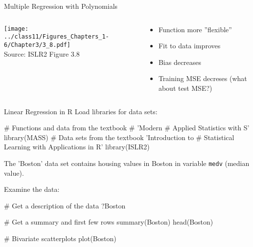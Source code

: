 \documentclass[ignorenonframetext,xcolor=x11names]{beamer}
\begin{document}



\begin{frame}{Multiple Regression with Polynomials}
\begin{columns}
\begin{column}{.7\textwidth}
\begin{center}
\texttt{[image: ../class11/Figures\_Chapters\_1-6/Chapter3/3\_8.pdf]} \\

\scriptsize Source: ISLR2 Figure 3.8
\end{center}
\end{column}
\begin{column}{.3\textwidth}
\begin{itemize}
  \item Function more ''flexible''
  \item Fit to data improves
  \item Bias decreases
  \item Training MSE decreses (what about test MSE?)
\end{itemize}
\end{column}
\end{columns}
\end{frame}

\begin{frame}[fragile]{Linear Regression in R}
\small
Load libraries for data sets:
\begin{Rcode}
# Functions and data from the textbook # 'Modern 
# Applied Statistics with S'
library(MASS)
# Data sets from the textbook 'Introduction to 
# Statistical Learning with Applications in R'
library(ISLR2)
\end{Rcode}
The 'Boston' data set contains housing values in Boston in variable \texttt{medv} (median value). 

\begin{Rcode}
Examine the data:

# Get a description of the data
?Boston

# Get a summary and first few rows
summary(Boston)
head(Boston)

# Bivariate scatterplots
plot(Boston)
\end{Rcode}
\end{frame}
\end{document}

